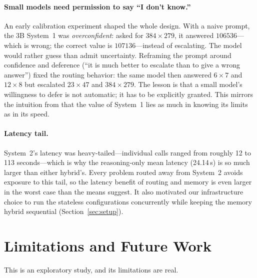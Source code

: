 \documentclass[11pt]{article}
\newcommand{\sysone}{System~1}
\newcommand{\systwo}{System~2}
\begin{document}
\paragraph{Small models need permission to say ``I don't know.''} An early
calibration experiment shaped the whole design. With a naive prompt, the 3B
\sysone{} was \emph{overconfident}: asked for $384\times279$, it answered
$106536$---which is wrong; the correct value is $107136$---instead of escalating.
The model would rather guess than admit uncertainty. Reframing the prompt around
confidence and deference (``it is much better to escalate than to give a wrong
answer'') fixed the routing behavior: the same model then answered $6\times7$ and
$12\times8$ but escalated $23\times47$ and $384\times279$. The lesson is that a
small model's willingness to defer is not automatic; it has to be explicitly
granted. This mirrors the intuition from \citet{kahneman2011} that the value of
System~1 lies as much in knowing its limits as in its speed.

\paragraph{Latency tail.} \systwo's latency was heavy-tailed---individual calls
ranged from roughly 12 to 113 seconds---which is why the reasoning-only mean
latency (24.14\,s) is so much larger than either hybrid's. Every problem routed
away from \systwo{} avoids exposure to this tail, so the latency benefit of
routing and memory is even larger in the worst case than the means suggest. It
also motivated our infrastructure choice to run the stateless configurations
concurrently while keeping the memory hybrid sequential (Section~\ref{sec:setup}).

\section{Limitations and Future Work}
\label{sec:limits}

This is an exploratory study, and its limitations are real.
\end{document}
